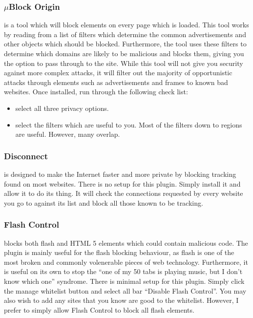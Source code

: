 \documentclass[a4paper,11pt]{book}
\begin{document}
		\subsubsection{$\mu{}$Block Origin}
			is a tool which will block elements on every page which is loaded. 
			This tool works by reading from a list of filters which determine the common advertisements and other objects which should be blocked. 
			Furthermore, the tool uses these filters to determine which domains are likely to be malicious and blocks them, giving you the option to pass through to the site. 
			While this tool will not give you security against more complex attacks, it will filter out the majority of opportunistic attacks through elements such as advertisements and frames to known bad websites. 
			Once installed, run through the following check list: 
			\begin{itemize}
				\item select all three privacy options.
				\item select the filters which are useful to you. 
					Most of the filters down to regions are useful. However, many overlap. 
			\end{itemize}
		\subsubsection{Disconnect}
			is designed to make the Internet faster and more private by blocking tracking found on most websites. 
			There is no setup for this plugin. Simply install it and allow it to do its thing. 
			It will check the connections requested by every website you go to against its list and block all those known to be tracking. 
		\subsubsection{Flash Control}
			blocks both flash and HTML 5 elements which could contain malicious code. 
			The plugin is mainly useful for the flash blocking behaviour, as flash is one of the most broken and commonly volenerable pieces of web technology. 
			Furthermore, it is useful on its own to stop the ``one of my 50 tabs is playing music, but I don't know which one'' syndrome. 
			There is minimal setup for this plugin. Simply click the manage whitelist button and select all bar ``Disable Flash Control''. 
			You may also wish to add any sites that you know are good to the whitelist. 
			However, I prefer to simply allow Flash Control to block all flash elements. 
\end{document}
